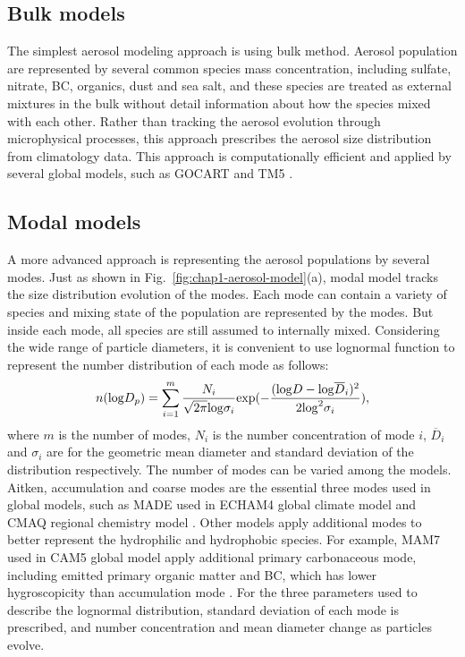 \documentclass[edeposit,fullpage]{uiucthesis2009}
\begin{document}
\subsection{Bulk models}
The simplest aerosol modeling approach is using bulk method. Aerosol population are represented by several common species mass concentration, including sulfate, nitrate, BC, organics, dust and sea salt, and these species are treated as external mixtures in the bulk without detail information about how the species mixed with each other. Rather than tracking the aerosol evolution through microphysical processes, this approach prescribes the aerosol size distribution from climatology data. This approach is computationally efficient and applied by several global models, such as GOCART \citep{chin2000atmospheric} and TM5 \citep{vignati2010sources}. 

\subsection{Modal models}
A more advanced approach is representing the aerosol populations by several modes. Just as shown in Fig.~\ref{fig:chap1-aerosol-model}(a), modal model tracks the size distribution evolution of the modes. Each mode can contain a variety of species and mixing state of the population are represented by the modes. But inside each mode, all species are still assumed to internally mixed. Considering the wide range of particle diameters, it is convenient to use lognormal function to represent the number distribution of each mode as follows:
\begin{equation}
\centering
    n({\rm log}D_p) = \sum_{i=1}^{m}\frac{N_i}{\sqrt{2\pi}{\rm log}\sigma_i}{\rm exp}(-\frac{({\rm log}D-{\rm log}{\overline{D}_i})^2}{2{\rm log}^2\sigma_i}),
\end{equation}
where $m$ is the number of modes, $N_i$ is the number concentration of mode $i$, $\overline{D}_{i}$ and $\sigma_i$ are for the geometric mean diameter and standard deviation of the distribution respectively. The number of modes can be varied among the models. Aitken, accumulation and coarse modes are the essential three modes used in global models, such as MADE used in ECHAM4 global climate model and CMAQ regional chemistry model \citep{lauer2005simulating, binkowski2003models}. Other models apply additional modes to better represent the hydrophilic and hydrophobic species. For example, MAM7 used in CAM5 global model apply additional primary carbonaceous mode, including emitted primary organic matter and BC, which has lower hygroscopicity than accumulation mode \citep{liu2012toward}. For the three parameters used to describe the lognormal distribution, standard deviation of each mode is prescribed, and number concentration and mean diameter change as particles evolve.
\end{document}
